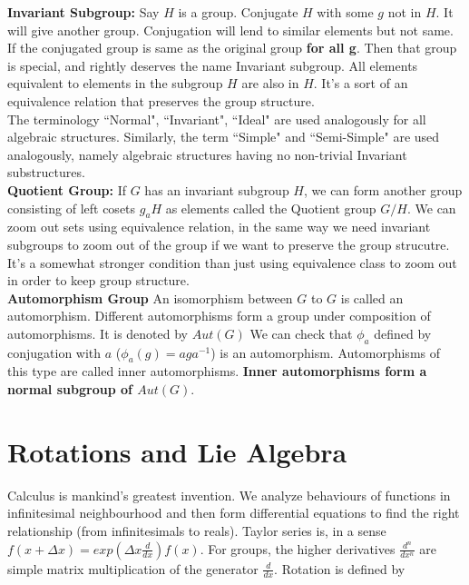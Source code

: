 \documentclass{report}
\begin{document}
\noindent\textbf{Invariant Subgroup:} Say $H$ is a group. Conjugate $H$ with some $g$ not in $H$. It will give another group. Conjugation will lend to similar elements but not same. If the conjugated group is same as the original group \textbf{for all g}. Then that group is special, and rightly deserves the name Invariant subgroup. All elements equivalent to elements in the subgroup $H$ are also in $H$. It's a sort of an equivalence relation that preserves the group structure.\\

\noindent The terminology ``Normal", ``Invariant", ``Ideal" are used analogously for all algebraic structures. Similarly, the term ``Simple" and ``Semi-Simple" are used analogously, namely algebraic structures having no non-trivial Invariant substructures.\\

\noindent\textbf{Quotient Group:} If $G$ has an invariant subgroup $H$, we can form another group consisting of left cosets $g_aH$ as elements called the Quotient group $G/H$. We can zoom out sets using equivalence relation, in the same way we need invariant subgroups to zoom out of the group if we want to preserve the group strucutre. It's a somewhat stronger condition than just using equivalence class to zoom out in order to keep group structure. \\

\noindent\textbf{Automorphism Group} An isomorphism between $G$ to $G$ is called an automorphism. Different automorphisms form a group under composition of automorphisms. It is denoted by $Aut(G)$ We can check that $\phi_a$ defined by conjugation with $a$ ($\phi_a(g) = aga^{-1}$) is an automorphism. Automorphisms of this type are called inner automorphisms. \textbf{Inner automorphisms form a normal subgroup of $Aut(G)$}.

\section{Rotations and Lie Algebra}

Calculus is mankind's greatest invention. We analyze behaviours of functions in infinitesimal neighbourhood and then form differential equations to find the right relationship (from infinitesimals to reals). Taylor series is, in a sense $f(x+\Delta x) = exp(\Delta x\frac{d}{dx})f(x)$. For groups, the higher derivatives $\frac{d^n}{dx^n}$ are simple matrix multiplication of the generator $\frac{d}{dx}$. Rotation is defined by
\end{document}
